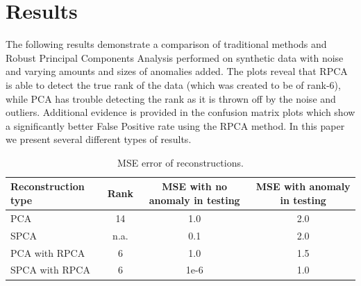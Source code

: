 \documentclass[conference]{IEEEtran}
\begin{document}
\section{Results}
The following results demonstrate a comparison of traditional methods and Robust Principal Components Analysis performed on synthetic data with noise and varying amounts and sizes of anomalies added.  The plots reveal that RPCA is able to detect the true rank of the data (which was created to be of rank-6), while PCA has trouble detecting the rank as it is thrown off by the noise and outliers.  Additional evidence is provided in the confusion matrix plots which show a significantly better False Positive rate using the RPCA method.
In this paper we present several different types of results. 

\begin{table}[h!]
    \begin{center}
      \caption{MSE error of reconstructions.}
      \label{tab:table1}
      \begin{tabular}{l|c|c|c} %
        \textbf{Reconstruction type} & Rank & \begin{minipage}{1in}\textbf{MSE with no anomaly in testing}\end{minipage} & \begin{minipage}{1in}\textbf{MSE with anomaly in testing}\end{minipage}\\
        \hline
        PCA & 14 & 1.0 & 2.0\\
        SPCA & n.a. & 0.1 & 2.0 \\
        PCA with RPCA & 6 & 1.0 &  1.5 \\
        SPCA with RPCA & 6 & 1e-6 & 1.0 \\
      \end{tabular}
    \end{center}
\end{table}
\end{document}
